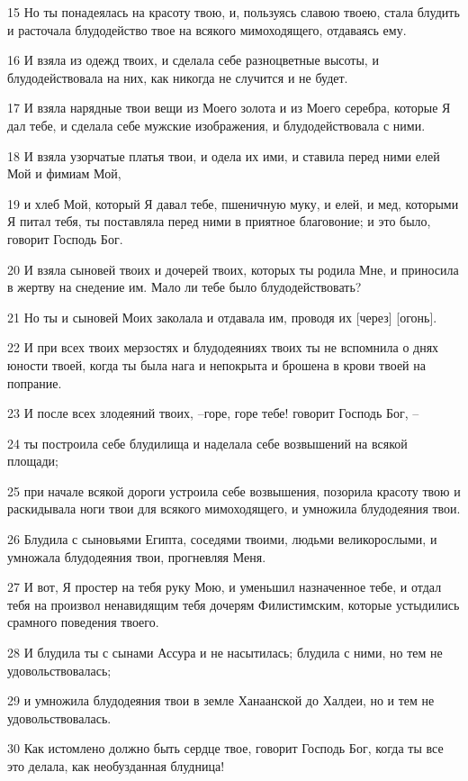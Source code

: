 \par 15 Но ты понадеялась на красоту твою, и, пользуясь славою твоею, стала блудить и расточала блудодейство твое на всякого мимоходящего, отдаваясь ему.
\par 16 И взяла из одежд твоих, и сделала себе разноцветные высоты, и блудодействовала на них, как никогда не случится и не будет.
\par 17 И взяла нарядные твои вещи из Моего золота и из Моего серебра, которые Я дал тебе, и сделала себе мужские изображения, и блудодействовала с ними.
\par 18 И взяла узорчатые платья твои, и одела их ими, и ставила перед ними елей Мой и фимиам Мой,
\par 19 и хлеб Мой, который Я давал тебе, пшеничную муку, и елей, и мед, которыми Я питал тебя, ты поставляла перед ними в приятное благовоние; и это было, говорит Господь Бог.
\par 20 И взяла сыновей твоих и дочерей твоих, которых ты родила Мне, и приносила в жертву на снедение им. Мало ли тебе было блудодействовать?
\par 21 Но ты и сыновей Моих заколала и отдавала им, проводя их [через] [огонь].
\par 22 И при всех твоих мерзостях и блудодеяниях твоих ты не вспомнила о днях юности твоей, когда ты была нага и непокрыта и брошена в крови твоей на попрание.
\par 23 И после всех злодеяний твоих, --горе, горе тебе! говорит Господь Бог, --
\par 24 ты построила себе блудилища и наделала себе возвышений на всякой площади;
\par 25 при начале всякой дороги устроила себе возвышения, позорила красоту твою и раскидывала ноги твои для всякого мимоходящего, и умножила блудодеяния твои.
\par 26 Блудила с сыновьями Египта, соседями твоими, людьми великорослыми, и умножала блудодеяния твои, прогневляя Меня.
\par 27 И вот, Я простер на тебя руку Мою, и уменьшил назначенное тебе, и отдал тебя на произвол ненавидящим тебя дочерям Филистимским, которые устыдились срамного поведения твоего.
\par 28 И блудила ты с сынами Ассура и не насытилась; блудила с ними, но тем не удовольствовалась;
\par 29 и умножила блудодеяния твои в земле Ханаанской до Халдеи, но и тем не удовольствовалась.
\par 30 Как истомлено должно быть сердце твое, говорит Господь Бог, когда ты все это делала, как необузданная блудница!
